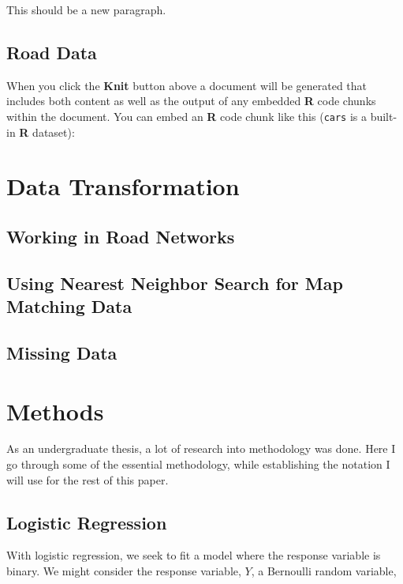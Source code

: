 \documentclass[12pt,twoside]{reedthesis}
\begin{document}
  This should be a new paragraph.
  
  \section{Road Data}\label{road-data}
  
  When you click the \textbf{Knit} button above a document will be
  generated that includes both content as well as the output of any
  embedded \textbf{R} code chunks within the document. You can embed an
  \textbf{R} code chunk like this (\texttt{cars} is a built-in \textbf{R}
  dataset):
  
  \chapter{Data Transformation}\label{data-trans}
  
  \section{Working in Road Networks}\label{working-in-road-networks}
  
  \section{Using Nearest Neighbor Search for Map Matching
  Data}\label{using-nearest-neighbor-search-for-map-matching-data}
  
  \section{Missing Data}\label{missing-data}
  
  \chapter{Methods}\label{methods}
  
  As an undergraduate thesis, a lot of research into methodology was done.
  Here I go through some of the essential methodology, while establishing
  the notation I will use for the rest of this paper.
  
  \section{Logistic Regression}\label{logistic-regression}
  
  With logistic regression, we seek to fit a model where the response
  variable is binary. We might consider the response variable, \(Y\), a
  Bernoulli random variable,
  
\end{document}
